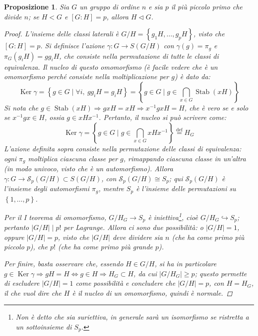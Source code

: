 \documentclass[12pt]{scrartcl}
\theoremstyle{style}
\newtheorem{prop}{Proposizione}[section]
\numberwithin{equation}{subsection}
\begin{document}
\begin{prop}\label{propnlag}
	Sia $G$ un gruppo di ordine $n$ e sia $p$ il pi\`u piccolo primo che divide $n$; se $H < G$ e $[G : H ] = p$, allora $H \lhd G$.
	\begin{proof}
		L'insieme delle classi laterali \`e $G / H = \left\{ g_1H , \ldots, g_p H \right\} $, visto che $[G:H] = p$.
		Si definisce l'azione $\gamma: G \to S(G / H)$ con $\gamma(g) = \pi _g$ e $\pi_G (g_i H) = gg_i H$, che consiste nella permutazione di tutte le classi di equivalenza.
		Il nucleo di questo omomorfismo (\`e facile vedere che \`e un omomorfismo perch\'e consiste nella moltiplicazione per $g$) \`e dato da:
		\[
			\operatorname{Ker} \gamma = \left\{ g \in  G  \mid \forall i, \ g g_{i} H = g_i H \right\} = \left\{ g \in  G  \mid g \in \bigcap _{x \in G} \operatorname{Stab} (xH) \right\} 
		\] 
		Si nota che $g \in \operatorname{Stab} (xH) \Rightarrow gx H = xH \Rightarrow x^{-1}gx H = H$, che \`e vero se e solo se $x^{-1}g x \in H$, ossia $g \in  x H x^{-1}$.
		Pertanto, il nucleo si pu\`o scrivere come:
		\[
		\operatorname{Ker} \gamma = \left\{ g \in  G  \mid g \in \bigcap_{x \in  G}  xH x^{-1}  \right\} \overset{\text{def}}{=}H_G
		\] 
		L'azione definita sopra consiste nella permutazione delle classi di equivalenza: ogni $\pi_g$ moltiplica ciascuna classe per $g$, rimappando ciascuna classe in un'altra (in modo univoco, visto che \`e un automorfismo). 
		Allora $\gamma : G \to \mathcal{S} _p (G / H) \subset S(G/H)$, con $\mathcal{S}_p (G / H) \cong S_p$; qui $\mathcal{S}_p(G / H) $ \`e l'insieme degli automorfismi $\pi_g$, mentre $S_p$ \`e l'insieme delle permutazioni su $\left\{ 1, \ldots, p  \right\} $.

		Per il I teorema di omomorfismo, $G / H_G \longrightarrow S_p$ \`e iniettiva\footnote{Non \`e detto che sia suriettiva, in generale sar\`a un isomorfismo se ristretta a un sottoinsieme di $S_p$.}, cio\`e $G / H_G \hookrightarrow S_p$; pertanto $\lvert G / H \rvert  \mid p !$ per Lagrange.
		Allora ci sono due possibilit\`a: o $\lvert G / H \rvert  =1 $, oppure $\lvert G / H \rvert = p$, visto che $\lvert G / H \rvert $ deve dividere sia $n$ (che ha come primo pi\`u piccolo $p$), che $p!$ (che ha come primo pi\`u grande $p$).

		Per finire, basta osservare che, essendo $H \in G / H$, si ha in particolare $g \in \operatorname{Ker} \gamma\Rightarrow gH = H \iff g \in  H \Rightarrow  H_G \subset H$, da cui $\lvert G / H_G \rvert\ge p $; questo permette di escludere $\lvert G / H \rvert  =1$ come possibilit\`a e concludere che $\lvert G / H \rvert = p$, con $H = H_G$, il che vuol dire che $H$ \`e il nucleo di un omomorfismo, quindi \`e normale.
	\end{proof}
\end{prop}
\end{document}
